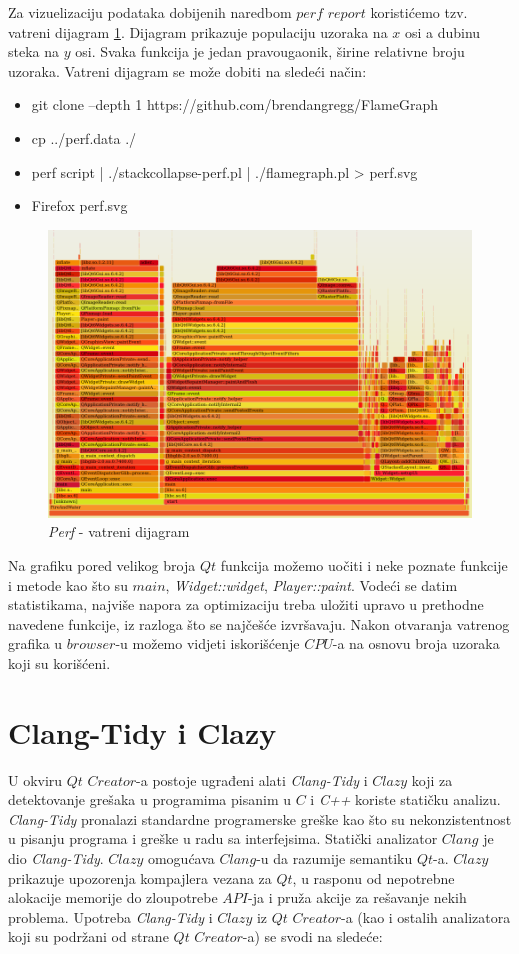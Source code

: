 \documentclass[a4paper]{article}
\begin{document}
Za vizuelizaciju podataka dobijenih naredbom $perf$ $report$ koristićemo tzv. vatreni dijagram \ref{fig:p2}. Dijagram prikazuje populaciju uzoraka na $x$ osi a dubinu steka na $y$ osi. Svaka funkcija je jedan pravougaonik, širine relativne broju uzoraka. Vatreni dijagram se može dobiti na sledeći način:
\begin{itemize}
	\item git clone --depth 1 https://github.com/brendangregg/FlameGraph
	\item cp ../perf.data ./
	\item perf script | ./stackcollapse-perf.pl | ./flamegraph.pl > perf.svg
	\item Firefox perf.svg
\end{itemize}
	
	\begin{figure}[h!]
		\caption{\textit{Perf} - vatreni dijagram}
		\label{fig:p2}
		\includegraphics[scale=0.4]{../Perf/p2.png}
	\end{figure}

Na grafiku pored velikog broja $Qt$ funkcija možemo uočiti i neke poznate funkcije i metode kao što su $main$, \textit{Widget::widget}, \textit{Player::paint}. Vodeći se datim statistikama, najviše napora za optimizaciju treba uložiti upravo u prethodne navedene funkcije, iz razloga što se najčešće izvršavaju. Nakon otvaranja vatrenog grafika u $browser$-u možemo vidjeti iskorišćenje $CPU$-a na osnovu broja uzoraka koji su korišćeni.

\section{Clang-Tidy i Clazy}
	U okviru $Qt$ $Creator$-a postoje ugrađeni alati \textit{Clang-Tidy} i $Clazy$ koji za detektovanje grešaka u programima pisanim u $C$ i \textit{C++} koriste statičku analizu.
\textit{Clang-Tidy} pronalazi standardne programerske greške kao što su nekonzistentnost  u pisanju programa i greške u radu sa interfejsima. Statički analizator $Clang$ je dio \textit{Clang-Tidy}.
$Clazy$ omogućava $Clang$-u da razumije semantiku $Qt$-a. $Clazy$ prikazuje upozorenja kompajlera vezana za $Qt$, u rasponu od nepotrebne alokacije memorije do zloupotrebe $API$-ja i pruža akcije za rešavanje nekih problema.
Upotreba \textit{Clang-Tidy} i $Clazy$ iz $Qt$ $Creator$-a (kao i ostalih analizatora koji su podržani od strane $Qt$ $Creator$-a) se svodi na sledeće:
\end{document}
